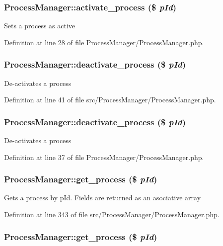 \subsubsection{\setlength{\rightskip}{0pt plus 5cm}Process\-Manager::activate\_\-process (\$ {\em p\-Id})}\label{classProcessManager_a1}


Sets a process as active 

Definition at line 28 of file Process\-Manager/Process\-Manager.php.
\subsubsection{\setlength{\rightskip}{0pt plus 5cm}Process\-Manager::deactivate\_\-process (\$ {\em p\-Id})}\label{classProcessManager_a12}


De-activates a process 

Definition at line 41 of file src/Process\-Manager/Process\-Manager.php.
\subsubsection{\setlength{\rightskip}{0pt plus 5cm}Process\-Manager::deactivate\_\-process (\$ {\em p\-Id})}\label{classProcessManager_a2}


De-activates a process 

Definition at line 37 of file Process\-Manager/Process\-Manager.php.
\subsubsection{\setlength{\rightskip}{0pt plus 5cm}Process\-Manager::get\_\-process (\$ {\em p\-Id})}\label{classProcessManager_a18}


Gets a process by p\-Id. Fields are returned as an asociative array 

Definition at line 343 of file src/Process\-Manager/Process\-Manager.php.
\subsubsection{\setlength{\rightskip}{0pt plus 5cm}Process\-Manager::get\_\-process (\$ {\em p\-Id})}\label{classProcessManager_a5}


